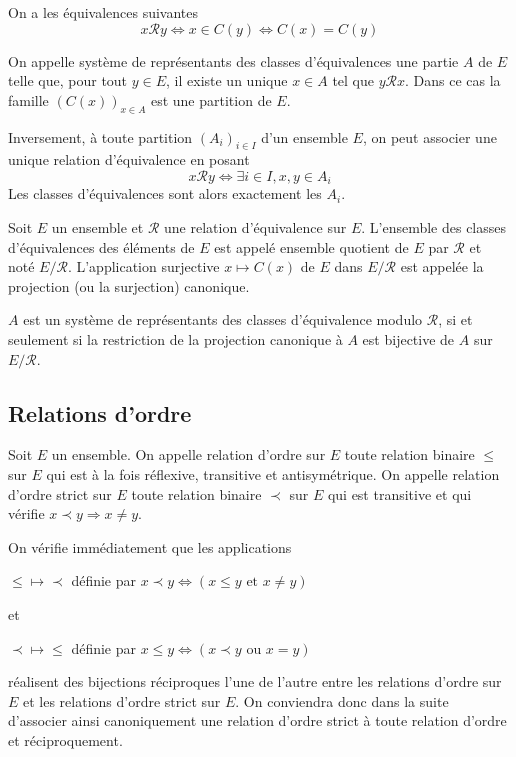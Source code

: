 \begin{rem}
On a les équivalences suivantes
\[
x \mathcal{R} y \Leftrightarrow x \in C(y) \Leftrightarrow C(x) = C(y)
\]
\end{rem}

\begin{de}
On appelle système de représentants des classes
d'équivalences une partie $A$ de $E$ telle que, pour tout $y \in E$, il existe
un unique $x \in A$ tel que $y\mathcal{R}x$. Dans ce cas la famille
$\left(C(x)\right)_{x \in A}$ est une partition de $E$.
\end{de}

\begin{rem}
Inversement, à toute partition $(A_i)_{i \in I}$ d'un ensemble $E$, on peut associer une unique
relation d'équivalence en posant
\[
x\mathcal{R}y \Leftrightarrow \exists i \in I, x,y \in A_i
\]
Les classes d'équivalences sont alors exactement les $A_i$.
\end{rem}

\begin{de}
Soit $E$ un ensemble et $\mathcal{R}$ une relation d'équivalence sur
$E$. L'ensemble des classes d'équivalences des éléments de $E$ est appelé
ensemble quotient de $E$ par $\mathcal{R}$ et noté $E/\mathcal{R}$. L'application surjective
$x \mapsto C(x)$ de $E$ dans $E/\mathcal{R}$ est appelée la
projection (ou la surjection) canonique.
\end{de}

\begin{rem}
$A$ est un système de représentants des classes
d'équivalence modulo $\mathcal{R}$, si et seulement si la restriction de la
projection canonique à $A$ est bijective de $A$ sur $E/\mathcal{R}$.
\end{rem}

\subsection{Relations d'ordre}

\begin{de}
Soit $E$ un ensemble. On appelle relation d'ordre sur $E$
toute relation binaire $\leqslant$ sur $E$ qui est à la fois réflexive, transitive
et antisymétrique. On appelle relation d'ordre strict sur $E$ toute
relation binaire $\prec$ sur $E$ qui est transitive et qui vérifie $x \prec y \Rightarrow x\neq y$.
\end{de}

\begin{rem}
On vérifie immédiatement que les applications

$\leqslant \mapsto \prec$ définie par $x \prec y \Leftrightarrow (x \leqslant y \text{ et } x \neq y)$

et

$\prec \mapsto \leqslant$ définie par $x \leqslant y \Leftrightarrow (x \prec y \text{ ou } x = y)$

réalisent des bijections réciproques l'une de l'autre entre les
relations d'ordre sur $E$ et les relations d'ordre strict sur $E$. On
conviendra donc dans la suite d'associer ainsi canoniquement une
relation d'ordre strict à toute relation d'ordre et réciproquement.
\end{rem}

